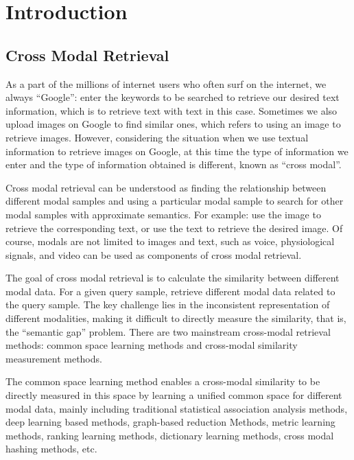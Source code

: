 \chapter{Introduction}
\label{cha:intro}



\section{Cross Modal Retrieval}


As a part of the millions of internet users who often surf on the internet, we always ``Google'': enter the keywords to be searched to retrieve our desired text information, which is to retrieve text with text in this case. Sometimes we also upload images on Google to find similar ones, which refers to using an image to retrieve images. However, considering the situation when we use textual information to retrieve images on Google, at this time the type of information we enter and the type of information obtained is different, known as ``cross modal''.

Cross modal retrieval can be understood as finding the relationship between different modal samples and using a particular modal sample to search for other modal samples with approximate semantics. For example: use the image to retrieve the corresponding text, or use the text to retrieve the desired image. Of course, modals are not limited to images and text, such as voice, physiological signals, and video can be used as components of cross modal retrieval.

The goal of cross modal retrieval is to calculate the similarity between different modal data. For a given query sample, retrieve different modal data related to the query sample. The key challenge lies in the inconsistent representation of different modalities, making it difficult to directly measure the similarity, that is, the ``semantic gap'' problem. There are two mainstream cross-modal retrieval methods: common space learning methods and cross-modal similarity measurement methods.

The common space learning method enables a cross-modal similarity to be directly measured in this space by learning a unified common space for different modal data, mainly including traditional statistical association analysis methods, deep learning based methods, graph-based reduction Methods, metric learning methods, ranking learning methods, dictionary learning methods, cross modal hashing methods, etc.

